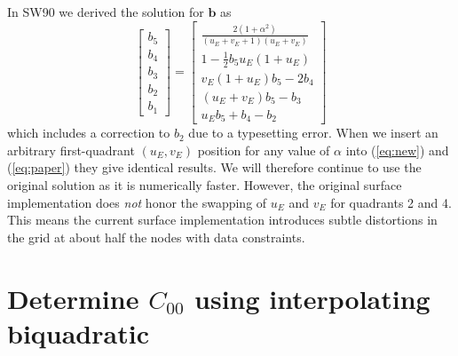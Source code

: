 \documentclass[12pt,letterpaper,margin=0.5in]{article}
\begin{document}
In SW90 we derived the solution for $\mathbf{b}$ as
\begin{equation}
\left[ {\begin{array}{*{20}{c}}
{{b_5}}\\
{{b_4}}\\
{{b_3}}\\
{{b_2}}\\
{{b_1}}
\end{array}} \right] = \left[ {\begin{array}{*{20}{c}}
{\frac{2(1+\alpha^2)}{\left (u_E + v_E + 1 \right)\left (u_E + v_E\right)}}\\[4pt]
{1 - \frac{1}{2}b_5u_E\left(1+u_E\right)}\\[4pt]
{v_E \left(1+u_E\right)b_5 - 2b_4}\\[4pt]
{\left(u_E+v_E\right)b_5 - b_3}\\[4pt]
{u_Eb_5 + b_4 - b_2}
\end{array}} \right]
\label{eq:paper}
\end{equation}
which includes a correction to $b_2$ due to a typesetting error.  When we insert an arbitrary first-quadrant
$(u_E, v_E)$ position for any value of $\alpha$ into (\ref{eq:new}) and (\ref{eq:paper}) they give identical results.
We will therefore continue to use the original solution as it is numerically faster.
However, the original surface implementation does \emph{not} honor the swapping of $u_E$ and $v_E$ for quadrants
2 and 4.  This means the current surface implementation introduces subtle distortions in the grid at about half
the nodes with data constraints.

\section{Determine $C_{00}$ using interpolating biquadratic}
\end{document}
